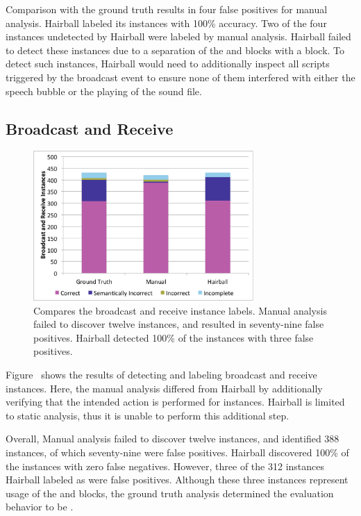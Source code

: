 Comparison with the ground truth results in four false positives for manual
analysis. Hairball labeled its instances with 100\% accuracy. Two of the four
instances undetected by Hairball were labeled \incom{} by manual
analysis. Hairball failed to detect these instances due to a separation of the
\say{} and \playsound{} blocks with a \broadcast{} block. To detect such
instances, Hairball would need to additionally inspect all scripts triggered by
the broadcast event to ensure none of them interfered with either the speech
bubble or the playing of the sound file.

\subsection{Broadcast and Receive}
\begin{figure}[!t]
\centering
\includegraphics[trim=.3in .15in .3in .15in, clip,
  width=3.3in]{graphs/AutoBroadcastReceive.eps}
\caption{Compares the broadcast and receive instance labels. Manual analysis
  failed to discover twelve instances, and resulted in seventy-nine false
  positives. Hairball detected 100\% of the instances with three false
  positives.}
\end{figure}

Figure~ shows the results of detecting and
labeling broadcast and receive instances. Here, the manual analysis differed
from Hairball by additionally verifying that the intended action is performed
for \correct{} instances. Hairball is limited to static analysis, thus it is
unable to perform this additional step.

Overall, Manual analysis failed to discover twelve instances, and identified
388 \correct{} instances, of which seventy-nine were false positives. Hairball
discovered 100\% of the instances with zero false negatives. However, three of
the 312 instances Hairball labeled as \correct{} were false positives. Although
these three instances represent \correct{} usage of the \broadcast{} and
\receive{} blocks, the ground truth analysis determined the evaluation behavior
to be \incor{}.



